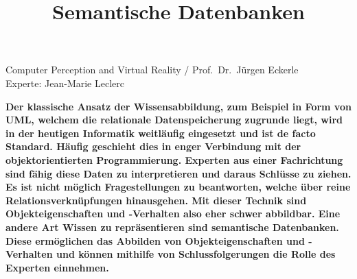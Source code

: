\documentclass[
    paper=a4,               %
    fontsize=10pt,          %
    open=right,             %
    titlepage=false,        %
    parskip=half,           %
]{scrreprt}                 %
\begin{document}
    \title{Semantische Datenbanken}

    Computer Perception and Virtual Reality / Prof.\ Dr.\ Jürgen Eckerle\\
    Experte: Jean-Marie Leclerc

    \textbf{Der klassische Ansatz der Wissensabbildung, zum Beispiel in Form von UML, welchem die relationale Datenspeicherung zugrunde liegt, wird in der heutigen Informatik weitläufig eingesetzt und ist de facto Standard. Häufig geschieht dies in enger Verbindung mit der objektorientierten Programmierung. Experten aus einer Fachrichtung sind fähig diese Daten zu interpretieren und daraus Schlüsse zu ziehen. Es ist nicht möglich Fragestellungen zu beantworten, welche über reine Relationsverknüpfungen hinausgehen. Mit dieser Technik sind Objekteigenschaften und -Verhalten also eher schwer abbildbar. Eine andere Art Wissen zu repräsentieren sind semantische Datenbanken. Diese ermöglichen das Abbilden von Objekteigenschaften und -Verhalten und können mithilfe von Schlussfolgerungen die Rolle des Experten einnehmen.}
\end{document}
